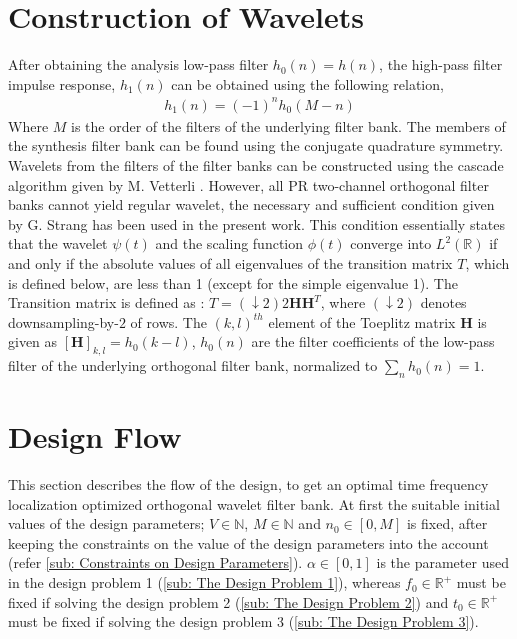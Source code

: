 \section{Construction of Wavelets}
\label{sec: Construction of wavelets}
After obtaining the analysis low-pass filter $h_0(n) = h(n)$, the high-pass filter impulse response, $h_1(n)$ can be obtained using the following relation,
\begin{eqnarray}
h_1(n) = (-1)^n h_0(M-n)
\end{eqnarray}
Where $M$ is the order of the filters of the underlying filter bank. The members of the synthesis filter bank can be found using the conjugate quadrature symmetry. Wavelets from the filters of the filter banks can be constructed using the cascade algorithm given by M. Vetterli \cite{key-12}. However, all PR two-channel orthogonal filter banks cannot yield regular wavelet, the necessary and sufficient condition given by G. Strang \cite{key-45} has been used in the present work. This condition essentially states that the wavelet $\psi(t)$ and the scaling function $\phi(t)$ converge into $L^{2}(\mathbb{R})$ if and only if the absolute values of all eigenvalues of the transition matrix $T$, which is defined below, are less than 1 (except for the simple eigenvalue 1). The Transition matrix is defined as : $T=\left(\downarrow2\right)2\mathbf{HH}^{T}$, where $\left(\downarrow2\right)$ denotes downsampling-by-$2$ of rows. The $(k,l)^{th}$ element of the Toeplitz matrix $\mathbf{H}$ is given as $[\mathbf{H}]_{k,l}=h_{0}(k-l)$, $h_{0}(n)$ are the filter coefficients of the low-pass filter of the underlying orthogonal filter bank, normalized to $\sum_{n}h_{0}(n)=1$.

\section{Design Flow}
\label{Design Flow}
This section describes the flow of the design, to get an optimal time frequency localization optimized orthogonal wavelet filter bank. At first the suitable initial values of the design parameters; $V \in \mathbb{N}$, $M \in \mathbb{N}$ and $n_0 \in [0,M]$ is fixed, after keeping the constraints on the value of the design parameters into the account (refer \ref{sub: Constraints on Design Parameters}). $\alpha \in [0,1]$ is the parameter used in the design problem 1 (\ref{sub: The Design Problem 1}), whereas $f_0 \in \mathbb{R^+}$ must be fixed if solving the design problem 2 (\ref{sub: The Design Problem 2}) and $t_0 \in \mathbb{R^+}$ must be fixed if solving the design problem 3 (\ref{sub: The Design Problem 3}).  

